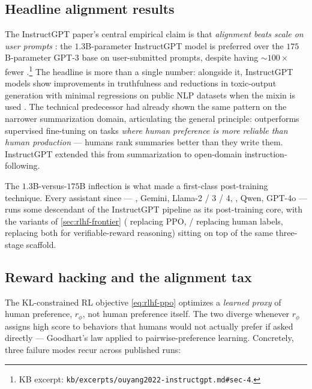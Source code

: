 \subsection{Headline alignment results}
\label{sec:rlhf-headline}

The InstructGPT paper's central empirical claim is that
\emph{alignment beats scale on user prompts}
\citep[\S 4]{ouyang2022-instructgpt}: the $1.3$B-parameter
InstructGPT model is preferred over the $175$B-parameter GPT-3 base
on user-submitted prompts, despite having $\sim\!100\times$ fewer
.\footnote{KB excerpt:
\texttt{kb/excerpts/ouyang2022-instructgpt.md\#sec-4}.} The headline
is more than a single number: alongside it, InstructGPT models show
improvements in truthfulness and reductions in toxic-output generation
with minimal regressions on public NLP datasets when the 
mixin is used \citep[\S 4]{ouyang2022-instructgpt}. The technical
predecessor \citep{stiennon2020-summarize} had already shown the same
pattern on the narrower summarization domain, articulating the general
principle:  outperforms supervised fine-tuning on tasks
\emph{where human preference is more reliable than human production} —
humans rank summaries better than they write them. InstructGPT
extended this from summarization to open-domain instruction-following.

The $1.3$B-versus-$175$B inflection is what made  a first-class
post-training technique. Every assistant  since — , Gemini,
Llama-2 / 3 / 4, , Qwen, GPT-4o — runs some descendant of the
InstructGPT pipeline as its post-training core, with the variants of
\cref{sec:rlhf-frontier} ( replacing PPO,  /  replacing
human labels,  replacing both for verifiable-reward reasoning)
sitting on top of the same three-stage scaffold.

\subsection{Reward hacking and the alignment tax}
\label{sec:rlhf-hacking}

The KL-constrained RL objective \cref{eq:rlhf-ppo} optimizes a
\emph{learned proxy} of human preference, $r_\phi$, not human
preference itself. The two diverge whenever $r_\phi$ assigns high
score to behaviors that humans would not actually prefer if asked
directly — Goodhart's law applied to pairwise-preference learning.
Concretely, three failure modes recur across published  runs:

